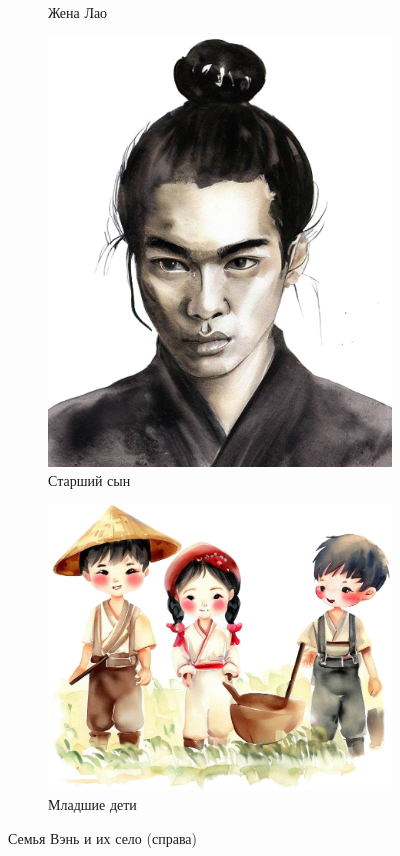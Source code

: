 \documentclass[a5paper,11pt]{memoir}
\begin{document}
\begin{figure}[h]
\begin{subfigure}{.3\textwidth}
		\caption{Жена Лао}
	\end{subfigure}%
\begin{subfigure}{.3\textwidth}
	\centering
	\includegraphics[width=.8\linewidth]{images/lao-elder-son.png}
	\caption{Старший сын}
\end{subfigure}

	\begin{subfigure}{\textwidth}
	\vspace{2cm}
		\centering
		\includegraphics[width=.7\linewidth]{images/lao-kids.png}
		\caption{Младшие дети}
	\end{subfigure}
	\caption{Семья Вэнь и их село (справа)}
\end{figure}
\end{document}
